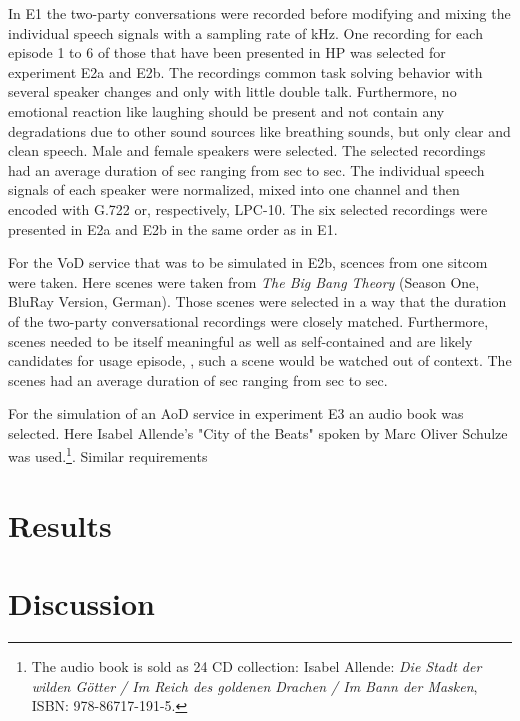 In E1 the two-party conversations were recorded before modifying and mixing the individual speech signals with a sampling rate of \unit[16]{kHz}.
One recording for each episode 1 to 6 of those that have been presented in \ac{HP} was selected for experiment E2a and E2b.
The recordings common task solving behavior with several speaker changes and only with little double talk.
Furthermore, no emotional reaction like laughing should be present and not contain any degradations due to other sound sources like breathing sounds, but only clear and clean speech.
Male and female speakers were selected.
The selected recordings had an average duration of \unit[153]{sec} ranging from \unit[128]{sec} to \unit[194]{sec}.
The individual speech signals of each speaker were normalized, mixed into one channel and then encoded with G.722 or, respectively, LPC-10.
The six selected recordings were presented in E2a and E2b in the same order as in E1.

For the \ac{VoD} service that was to be simulated in E2b, scences from one sitcom were taken.
Here scenes were taken from \emph{The Big Bang Theory} (Season One, BluRay Version, German).
Those scenes were selected in a way that the duration of the two-party conversational recordings were closely matched.
Furthermore, scenes needed to be itself meaningful as well as self-contained and are likely candidates for usage episode, \ie, such a scene would be watched out of context.
The scenes had an average duration of \unit[166]{sec} ranging from \unit[134]{sec} to \unit[198]{sec}.

For the simulation of an \ac{AoD} service in experiment E3 an audio book was selected.
Here Isabel Allende's "City of the Beats" spoken by Marc Oliver Schulze was used.\footnote{The audio book is sold as 24 CD collection: Isabel Allende: \emph{Die Stadt der wilden Götter / Im Reich des goldenen Drachen / Im Bann der Masken}, ISBN: 978-86717-191-5.}.
Similar requirements 



















 

\section{Results}
\section{Discussion}